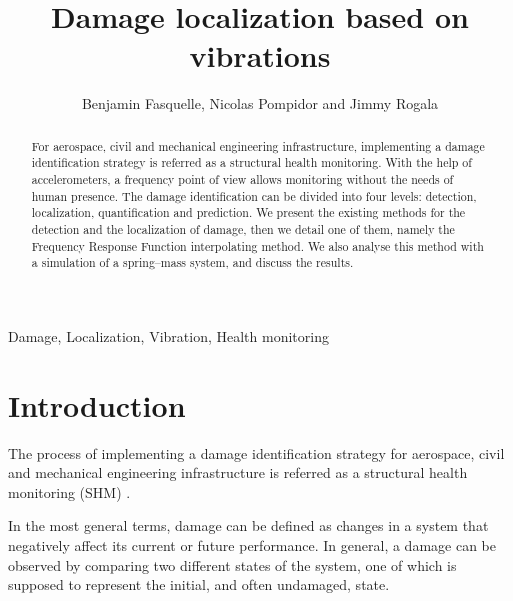 \documentclass[journal]{IEEEtran}
\begin{document}
%
\title{Damage localization based on vibrations}


\author{Benjamin Fasquelle, Nicolas Pompidor and Jimmy Rogala}

\newtheorem{remark}{Remark}



\maketitle


\begin{abstract}
For aerospace, civil and mechanical engineering infrastructure, implementing a damage identification strategy is referred as a structural health monitoring.
With the help of accelerometers, a frequency point of view allows monitoring without the needs of human presence.
The damage identification can be divided into four levels: detection, localization, quantification and prediction.
We present the existing methods for the detection and the localization of damage, then we detail one of them, namely the Frequency Response Function interpolating method.
We also analyse this method with a simulation of a spring–mass system, and discuss the results.



\end{abstract}

\begin{IEEEkeywords}
Damage, Localization, Vibration, Health monitoring
\end{IEEEkeywords}


\IEEEpeerreviewmaketitle



\section{Introduction}


The process of implementing a damage identification strategy for aerospace,
 civil and mechanical engineering infrastructure is referred as a structural health monitoring (SHM) \cite{farrar2007introduction}.

In the most general terms, damage can be defined as changes in a system that negatively affect its current or future performance.
In general, a damage can be observed by comparing two different states of the system,
 one of which is supposed to represent the initial, and often undamaged, state.
\end{document}
